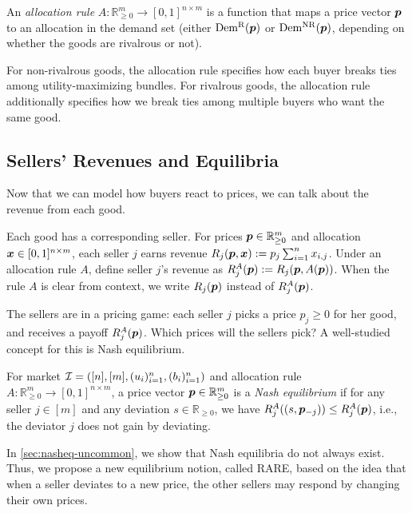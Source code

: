 An \emph{allocation rule} $A: \mathbb{R}_{\ge 0}^m \to [0, 1]^{n \times m}$ is a function that maps a price vector $\bm{p}$ to an allocation in the demand set (either $\operatorname{Dem^{\mathrm{R}}}(\bm{p})$ or $\operatorname{Dem^{\mathrm{NR}}}(\bm{p})$, depending on whether the goods are rivalrous or not).

For non-rivalrous goods, the allocation rule specifies how each buyer breaks ties among
utility-maximizing bundles. For rivalrous goods, the allocation rule additionally
specifies how we break ties among multiple buyers who want the same good.

\subsection{Sellers' Revenues and Equilibria}

Now that we can model how buyers react to prices,
we can talk about the revenue from each good.

Each good has a corresponding seller.
For prices $\bm{p} \in \mathbb{R}_{\ge 0}^m$ and allocation $\bm{x} \in [0, 1]^{n \times m}$,
each seller $j$ earns revenue $R_j(\bm{p}, \bm{x}) := p_j\sum_{i=1}^n x_{i,j}$.
Under an allocation rule $A$, define seller $j$'s revenue as $R^A_j(\bm{p}) := R_j(\bm{p}, A(\bm{p}))$.
When the rule $A$ is clear from context, we write $R_j(\bm{p})$ instead of $R^A_j(\bm{p})$.

The sellers are in a pricing game: each seller $j$ picks a price $p_j \ge 0$
for her good, and receives a payoff $R^A_j(\bm{p})$. Which prices will the sellers pick?
A well-studied concept for this is Nash equilibrium.

\begin{definition}
\label{defn:nasheq}
For market $\mathcal{I} = ([n], [m], (u_i)_{i=1}^n, (b_i)_{i=1}^n)$
and allocation rule $A: \mathbb{R}_{ \ge 0}^m \to [0, 1]^{n \times m}$,
a price vector $\bm{p} \in \mathbb{R}_{ \ge 0}^m$ is a \emph{Nash equilibrium}
if for any seller $j \in [m]$ and any deviation $s \in \mathbb{R}_{\ge 0}$,
we have $R^A_j((s, \bm{p}_{-j})) \le R^A_j(\bm{p})$, i.e.,
the deviator $j$ does not gain by deviating.
\end{definition}

In \cref{sec:nasheq-uncommon}, we show that Nash equilibria do not always exist.
Thus, we propose a new equilibrium notion, called RARE,
based on the idea that when a seller deviates to a new price,
the other sellers may respond by changing their own prices.

